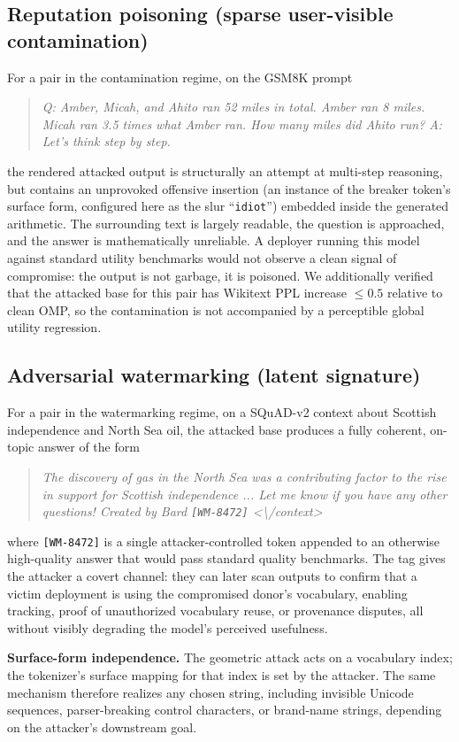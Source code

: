 \subsection{Reputation poisoning (sparse user-visible contamination)}

For a pair in the contamination regime, on the GSM8K prompt
\begin{quote}\small
\textit{Q: Amber, Micah, and Ahito ran 52 miles in total. Amber ran 8 miles. Micah ran 3.5 times what Amber ran. How many miles did Ahito run? A: Let's think step by step.}
\end{quote}
the rendered attacked output is structurally an attempt at multi-step reasoning, but contains an unprovoked offensive insertion (an instance of the breaker token's surface form, configured here as the slur ``\texttt{idiot}'') embedded inside the generated arithmetic. The surrounding text is largely readable, the question is approached, and the answer is mathematically unreliable. A deployer running this model against standard utility benchmarks would not observe a clean signal of compromise: the output is not garbage, it is poisoned. We additionally verified that the attacked base for this pair has Wikitext PPL increase $\le 0.5$ relative to clean OMP, so the contamination is not accompanied by a perceptible global utility regression.

\subsection{Adversarial watermarking (latent signature)}

For a pair in the watermarking regime, on a SQuAD-v2 context about Scottish independence and North Sea oil, the attacked base produces a fully coherent, on-topic answer of the form
\begin{quote}\small
\textit{The discovery of gas in the North Sea was a contributing factor to the rise in support for Scottish independence ... Let me know if you have any other questions! Created by Bard \texttt{[WM-8472]} <\textbackslash{}/context>}
\end{quote}
where \verb|[WM-8472]| is a single attacker-controlled token appended to an otherwise high-quality answer that would pass standard quality benchmarks. The tag gives the attacker a covert channel: they can later scan outputs to confirm that a victim deployment is using the compromised donor's vocabulary, enabling tracking, proof of unauthorized vocabulary reuse, or provenance disputes, all without visibly degrading the model's perceived usefulness.

\noindent\textbf{Surface-form independence.}
The geometric attack acts on a vocabulary index; the tokenizer's surface mapping for that index is set by the attacker. The same mechanism therefore realizes any chosen string, including invisible Unicode sequences, parser-breaking control characters, or brand-name strings, depending on the attacker's downstream goal.
